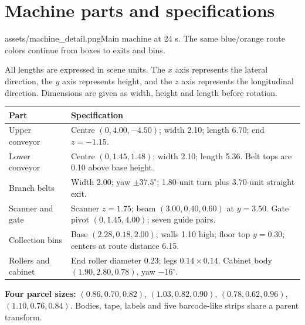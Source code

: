 \section{Machine parts and specifications}
\label{sec:machine_objects}
\begin{shot}{assets/machine_detail.png}{Main machine at 24 s. The same blue/orange route colors continue from boxes to exits and bins.}
\end{shot}
All lengths are expressed in scene units. The $x$ axis represents the lateral direction, the $y$ axis represents height, and the $z$ axis represents the longitudinal direction. Dimensions are given as width, height and length before rotation.
\par{\small\begin{tabularx}{\textwidth}{@{}L{34mm}Y@{}}\toprule
\textbf{Part} & \textbf{Specification}\\\midrule
Upper conveyor & Centre $(0,4.00,-4.50)$; width 2.10; length 6.70; end $z=-1.15$.\\
Lower conveyor & Centre $(0,1.45,1.48)$; width 2.10; length 5.36. Belt tops are 0.10 above base height.\\
Branch belts & Width 2.00; yaw $\pm37.5^\circ$; 1.80-unit turn plus 3.70-unit straight exit.\\
Scanner and gate & Scanner $z=1.75$; beam $(3.00,0.40,0.60)$ at $y=3.50$. Gate pivot $(0,1.45,4.00)$; seven guide pairs.\\
Collection bins & Base $(2.28,0.18,2.00)$; walls 1.10 high; floor top $y=0.30$; centers at route distance 6.15.\\
Rollers and cabinet & End roller diameter 0.23; legs $0.14\times0.14$. Cabinet body $(1.90,2.80,0.78)$, yaw $-16^\circ$.\\\bottomrule
\end{tabularx}}\par
\textbf{Four parcel sizes:} $(0.86,0.70,0.82)$, $(1.03,0.82,0.90)$, $(0.78,0.62,0.96)$, $(1.10,0.76,0.84)$. Bodies, tape, labels and five barcode-like strips share a parent transform.
